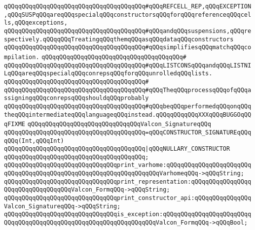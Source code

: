 \verb|qQQqqQQqqQQqqQQqqQQqqQQqqQQqqQQqqQQqqQQq#qQQqREFCELL_REP,qQQqEXCEPTION,qQQqSUSPqQQqareqQQqspecialqQQqconstructorsqQQqforqQQqreferenceqQQqcells,qQQqexceptions,|\newline
\verb|qQQqqQQqqQQqqQQqqQQqqQQqqQQqqQQqqQQqqQQq#qQQqandqQQqsuspensions,qQQqrespectively.qQQqqQQqTreatingqQQqthemqQQqasqQQqdataqQQqconstructors|\newline
\verb|qQQqqQQqqQQqqQQqqQQqqQQqqQQqqQQqqQQqqQQq#qQQqsimplifiesqQQqmatchqQQqcompilation.|\newline
\verb|qQQqqQQqqQQqqQQqqQQqqQQqqQQqqQQqqQQqqQQq#|\newline
\verb|qQQqqQQqqQQqqQQqqQQqqQQqqQQqqQQqqQQqqQQq#qQQqLISTCONSqQQqandqQQqLISTNILqQQqareqQQqspecialqQQqconrepsqQQqforqQQqunrolledqQQqlists.|\newline
\verb|qQQqqQQqqQQqqQQqqQQqqQQqqQQqqQQqqQQqqQQq#|\newline
\verb|qQQqqQQqqQQqqQQqqQQqqQQqqQQqqQQqqQQqqQQq#qQQqTheqQQqprocessqQQqofqQQqassigningqQQqconrepsqQQqshouldqQQqprobably|\newline
\verb|qQQqqQQqqQQqqQQqqQQqqQQqqQQqqQQqqQQqqQQq#qQQqbeqQQqperformedqQQqonqQQqtheqQQqintermediateqQQqlanguageqQQqinstead.qQQqqQQqqQQqXXXqQQqBUGGOqQQqFIXME|\newline
\newline
\verb|qQQqqQQqqQQqqQQqqQQqqQQqqQQqqQQqValcon_SignatureqQQq|\newline
\verb|qQQqqQQqqQQqqQQqqQQqqQQqqQQqqQQqqQQqqQQq=qQQqCONSTRUCTOR_SIGNATUREqQQqqQQq(Int,qQQqInt)|\newline
\verb|qQQqqQQqqQQqqQQqqQQqqQQqqQQqqQQqqQQqqQQq|\verb#|qQQqNULLARY_CONSTRUCTOR#\newline
\verb|qQQqqQQqqQQqqQQqqQQqqQQqqQQqqQQqqQQqqQQq;|\newline
\newline
\verb|qQQqqQQqqQQqqQQqqQQqqQQqqQQqqQQqprint_varhome:qQQqqQQqqQQqqQQqqQQqqQQqqQQqqQQqqQQqqQQqqQQqqQQqqQQqqQQqqQQqqQQqqQQqVarhomeqQQq->qQQqString;|\newline
\verb|qQQqqQQqqQQqqQQqqQQqqQQqqQQqqQQqprint_representation:qQQqqQQqqQQqqQQqqQQqqQQqqQQqqQQqqQQqValcon_FormqQQq->qQQqString;|\newline
\verb|qQQqqQQqqQQqqQQqqQQqqQQqqQQqqQQqprint_constructor_api:qQQqqQQqqQQqqQQqValcon_SignatureqQQq->qQQqString;|\newline
\verb|qQQqqQQqqQQqqQQqqQQqqQQqqQQqqQQqis_exception:qQQqqQQqqQQqqQQqqQQqqQQqqQQqqQQqqQQqqQQqqQQqqQQqqQQqqQQqqQQqqQQqqQQqValcon_FormqQQq->qQQqBool;|\newline
\newline
